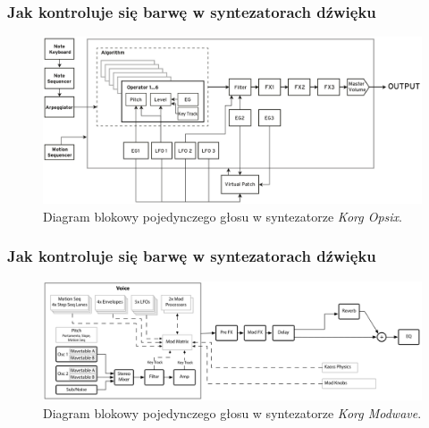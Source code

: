 \documentclass[]{beamer}
\begin{document}
\begin{frame}
  \frametitle{Jak kontroluje się barwę w syntezatorach dźwięku}

  \begin{figure}
    \centering
    \includegraphics[width=0.9\linewidth]{opsix_diagram.png}

    \caption{
      Diagram blokowy pojedynczego głosu w syntezatorze 
      \textit{Korg Opsix}.
    }
  \end{figure}
\end{frame}

\begin{frame}
  \frametitle{Jak kontroluje się barwę w syntezatorach dźwięku}

  \begin{figure}
    \centering
    \includegraphics[width=0.9\linewidth]{modwave_diagram.png}

    \caption{
      Diagram blokowy pojedynczego głosu w syntezatorze 
      \textit{Korg Modwave}.
    }
  \end{figure}
\end{frame}





\end{document}

